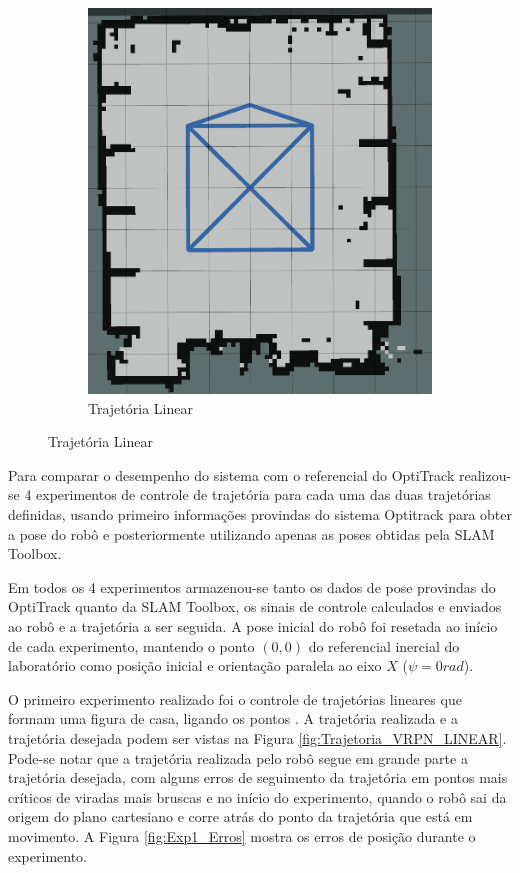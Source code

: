 \begin{figure}
\begin{subfigure}[b]{0.4\textwidth}
        \includegraphics[width=\textwidth]{img/Trajetoria_Casa.png}
        \caption{Trajetória Linear}
    \end{subfigure}
    \label{fig:exp_trajetorias}
    \sourceParbox[0.8\linewidth]
\end{figure}

Para comparar o desempenho do sistema com o referencial do OptiTrack realizou-se 4 experimentos de controle de trajetória para cada uma das duas trajetórias definidas, usando primeiro informações provindas do sistema Optitrack para obter a pose do robô e posteriormente utilizando apenas as poses obtidas pela SLAM Toolbox.

Em todos os 4 experimentos armazenou-se tanto os dados de pose provindas do OptiTrack quanto da SLAM Toolbox, os sinais de controle calculados e enviados ao robô e a trajetória a ser seguida. A pose inicial do robô foi resetada ao início de cada experimento, mantendo o ponto $(0,0)$ do referencial inercial do laboratório como posição inicial e orientação paralela ao eixo $X$ ($\psi = 0 rad$).

O primeiro experimento realizado foi o controle de trajetórias lineares que formam uma figura de casa, ligando os pontos . A trajetória realizada e a trajetória desejada podem ser vistas na Figura \ref{fig:Trajetoria_VRPN_LINEAR}. Pode-se notar que a trajetória realizada pelo robô segue em grande parte a trajetória desejada, com alguns erros de seguimento da trajetória em pontos mais críticos de viradas mais bruscas e no início do experimento, quando o robô sai da origem do plano cartesiano e corre atrás do ponto da trajetória que está em movimento. A Figura \ref{fig:Exp1_Erros} mostra os erros de posição durante o experimento.

